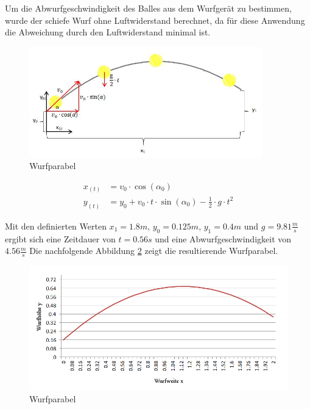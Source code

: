 Um die Abwurfgeschwindigkeit des Balles aus dem Wurfgerät zu bestimmen, wurde der schiefe
Wurf ohne Luftwiderstand berechnet, da für diese Anwendung die Abweichung durch den
Luftwiderstand minimal ist.
\begin{figure}[h!]
	\centering
	\includegraphics[width=0.9\textwidth]{Enddokumentation/Anhang/Bilder/Schiefer_Wurf2.jpg}
	\caption{Wurfparabel}
	\label{fig:Wurfparabel}
\end{figure}
\begin{align}
	x_{(t)} &= v_0 \cdot \cos(\alpha_0)\\
	y_{(t)} &= y_0 + v_0 \cdot t \cdot \sin(\alpha_0) - \frac{1}{2} \cdot g \cdot t^2
\end{align}

Mit den definierten Werten $x_1 = 1.8 m$, $y_0 = 0.125 m$, $y_1 = 0.4 m$ und 
$g = 9.81 \frac{m}{s}$ ergibt sich eine Zeitdauer von $t = 0.56 s$ und eine
Abwurfgeschwindigkeit von $4.56 \frac{m}{s}$ Die nachfolgende Abbildung
\ref{fig:Wurfparabel1} zeigt die resultierende Wurfparabel.
\begin{figure}[h!]
	\centering
	\includegraphics[width=1\textwidth]{Enddokumentation/Anhang/Bilder/Schiefer_Wurf.jpg}
	\caption{Wurfparabel}
	\label{fig:Wurfparabel1}
\end{figure}



